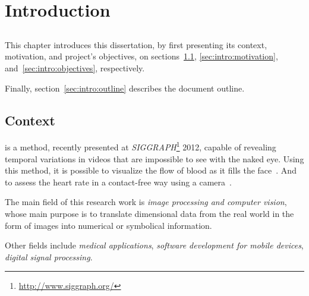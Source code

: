 \chapter{Introduction} \label{chap:intro}

\section*{}



This chapter introduces this dissertation, by first presenting its context,
motivation, and project's objectives, on sections~\ref{sec:intro:context},
\ref{sec:intro:motivation}, and~\ref{sec:intro:objectives}, respectively.

Finally, section~\ref{sec:intro:outline} describes the document outline.

\section{Context} \label{sec:intro:context}


\evm{} is a method, recently presented at
\emph{SIGGRAPH}\footnote{\url{http://www.siggraph.org/}} 2012, capable of
revealing temporal variations in videos that are impossible to see
with the naked eye. Using this method, it is possible to visualize
the flow of blood as it fills the face~\cite{Wu2012Eulerian}.
And to assess the heart rate in a contact-free way using a
camera~\cite{Wu2012Eulerian, Poh2010Non, Poh2011Advancements}.

The main field of this research work is \emph{image processing
and computer vision}, whose main purpose is to translate dimensional
data from the real world in the form of images into numerical
or symbolical information.

Other fields include \emph{medical applications}, \emph{software
development for mobile devices}, \emph{digital signal processing}.


